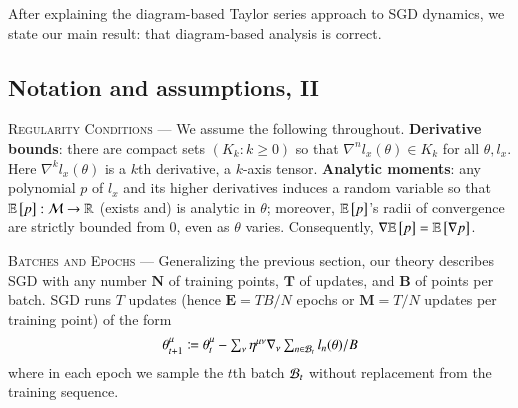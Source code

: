 

After explaining the diagram-based Taylor series approach to SGD dynamics, we
state our main result: that diagram-based analysis is correct.

        \subsection{Notation and assumptions, II}\label{sect:background}


\textsc{Regularity Conditions} ---
We assume the following throughout.
%
\textbf{Derivative bounds}:
there are compact sets $(K_k: k\geq 0)$ so that
$\nabla^n l_x(\theta)\in K_k$ for all $\theta,l_x$. 
Here $\nabla^k
l_x(\theta)$ is a $k$th derivative, a $k$-axis tensor.
%
\textbf{Analytic moments}:
any polynomial $p$ of $l_x$ and its higher derivatives
induces a random variable so that
$\mathbb{E}\left[p\right]:\mathcal{M}\to\mathbb{R}$ (exists and) is analytic in $\theta$;
moreover, $\mathbb{E}\left[p\right]$'s radii of convergence are strictly bounded from $0$,
even as $\theta$ varies.
%
Consequently, $\nabla \mathbb{E}\left[p\right]=\mathbb{E}\left[\nabla p\right]$.


            \textsc{Batches and Epochs} --- Generalizing the previous section,
            our theory describes SGD with
            any number
                {$\mathbf{N}$ of training points},
                {$\mathbf{T}$ of updates}, and 
                {$\mathbf{B}$ of points per batch}.
            SGD runs $T$ updates (hence
                {$\mathbf{E}=TB/N$ epochs} or
                {$\mathbf{M}=T/N$ updates per training point}) of the form
            $$
                \textstyle
                \theta_{t+1}^\mu
                \coloneqq
                \theta_t^\mu -
                \sum_\nu
                \eta^{\mu\nu} \nabla_\nu
                    \sum_{n\in \mathcal{B}_t} l_n(\theta) / B
            $$
            where in each epoch %
            we sample the
            $t$th batch $\mathcal{B}_t$ without replacement from the training sequence.

